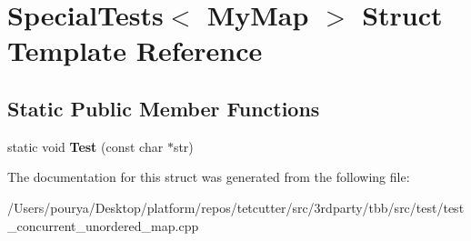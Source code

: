 \hypertarget{structSpecialTests_3_01MyMap_01_4}{}\section{Special\+Tests$<$ My\+Map $>$ Struct Template Reference}
\label{structSpecialTests_3_01MyMap_01_4}
\subsection*{Static Public Member Functions}
\begin{DoxyCompactItemize}
\item 
\hypertarget{structSpecialTests_3_01MyMap_01_4_adcc2f9067bc917afc5b6dab3af7adf18}{}static void {\bfseries Test} (const char $\ast$str)\label{structSpecialTests_3_01MyMap_01_4_adcc2f9067bc917afc5b6dab3af7adf18}

\end{DoxyCompactItemize}


The documentation for this struct was generated from the following file\+:\begin{DoxyCompactItemize}
\item 
/\+Users/pourya/\+Desktop/platform/repos/tetcutter/src/3rdparty/tbb/src/test/test\+\_\+concurrent\+\_\+unordered\+\_\+map.\+cpp\end{DoxyCompactItemize}
